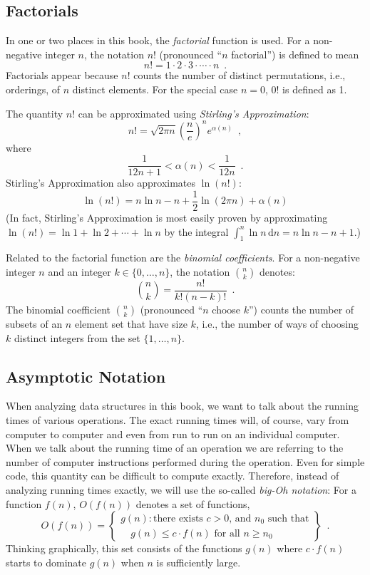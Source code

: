 \subsection{Factorials}

%
In one or two places in this book, the \emph{factorial} function is used.
For a non-negative integer $n$, the notation $n!$ (pronounced ``$n$ factorial'') is defined to mean 
\[
   n! = 1\cdot2\cdot3\cdot\cdots\cdot n \enspace .
\]
Factorials appear because $n!$ counts the number of distinct
permutations, i.e., orderings, of $n$ distinct elements.
%
For the special case $n=0$, $0!$ is defined as 1. 

%
The quantity $n!$ can be approximated using \emph{Stirling's Approximation}:
\[
	n! 
   = \sqrt{2\pi n}\left(\frac{n}{e}\right)^{n}e^{\alpha(n)} \enspace ,
\]
where
\[  
   \frac{1}{12n+1} <  \alpha(n) < \frac{1}{12n}  \enspace .
\]
Stirling's Approximation also approximates $\ln(n!)$:
\[
   \ln(n!) = n\ln n - n + \frac{1}{2}\ln(2\pi n) + \alpha(n)
\]
(In fact, Stirling's Approximation is most easily proven by approximating
$\ln(n!)=\ln 1 + \ln 2  + \cdots + \ln n$ by the integral
$\int_1^n \ln n\,\mathrm{d}n = n\ln n - n +1$.)

%
Related to the factorial function are the \emph{binomial coefficients}.
For a non-negative integer $n$ and an integer $k\in\{0,\ldots,n\}$,
the notation $\binom{n}{k}$ denotes:
\[
   \binom{n}{k} = \frac{n!}{k!(n-k)!} \enspace .
\]
The binomial coefficient $\binom{n}{k}$ (pronounced ``$n$ choose $k$'')
counts the number of subsets of an $n$ element set that have size $k$,
i.e., the number of ways of choosing $k$ distinct integers from the
set $\{1,\ldots,n\}$.

\subsection{Asymptotic Notation}

%
%
%
When analyzing data structures in this book, we want to talk about
the running times of various operations.  The exact running times will,
of course, vary from computer to computer and even from run to run on an
individual computer.  When we talk about the running time of an operation
we are referring to the number of computer instructions performed during
the operation.  Even for simple code, this quantity can be difficult to
compute exactly.  Therefore, instead of analyzing running times exactly,
we will use the so-called \emph{big-Oh notation}: For a function $f(n)$,
$O(f(n))$ denotes a set of functions,
\[
   O(f(n)) = \left\{
     \begin{array}{l}
       g(n):\mbox{there exists $c>0$, and $n_0$ such that} \\
             \quad\mbox{$g(n) \le c\cdot f(n)$ for all $n\ge n_0$}   
     \end{array} \right\} \enspace .
\]
Thinking graphically, this set consists of the functions $g(n)$ where
$c\cdot f(n)$ starts to dominate $g(n)$ when $n$ is sufficiently large.

